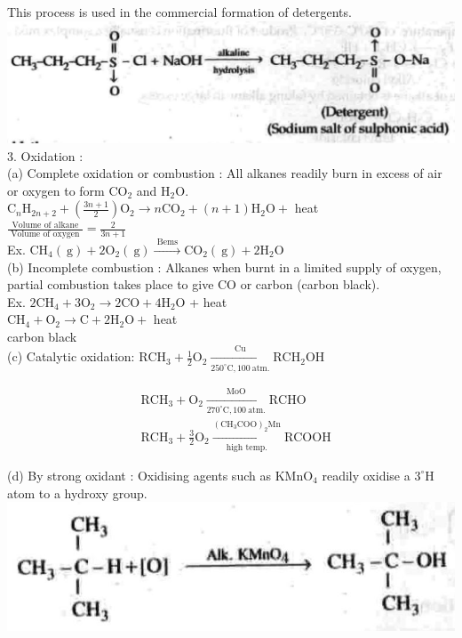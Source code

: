 \documentclass[10pt]{article}
\begin{document}
This process is used in the commercial formation of detergents.\\
\includegraphics[max width=\textwidth, center]{2025_01_28_8470952b98110cec3aabg-174(1)}\\
3. Oxidation :\\
(a) Complete oxidation or combustion : All alkanes readily burn in excess of air or oxygen to form $\mathrm{CO}_{2}$ and $\mathrm{H}_{2} \mathrm{O}$.\\
$\mathrm{C}_{n} \mathrm{H}_{2 n+2}+\left(\frac{3 n+1}{2}\right) \mathrm{O}_{2} \longrightarrow n \mathrm{CO}_{2}+(n+1) \mathrm{H}_{2} \mathrm{O}+$ heat\\
$\frac{\text { Volume of alkane }}{\text { Volume of oxygen }}=\frac{2}{3 n+1}$\\
Ex. $\mathrm{CH}_{4}(\mathrm{~g})+2 \mathrm{O}_{2}(\mathrm{~g}) \xrightarrow{\text { Bems }} \mathrm{CO}_{2}(\mathrm{~g})+2 \mathrm{H}_{2} \mathrm{O}$\\
(b) Incomplete combustion : Alkanes when burnt in a limited supply of oxygen, partial combustion takes place to give CO or carbon (carbon black).\\
Ex. $2 \mathrm{CH}_{4}+3 \mathrm{O}_{2} \longrightarrow 2 \mathrm{CO}+4 \mathrm{H}_{2} \mathrm{O}$ + heat\\
$\mathrm{CH}_{4}+\mathrm{O}_{2} \longrightarrow \mathrm{C}+2 \mathrm{H}_{2} \mathrm{O}+$ heat\\
carbon black\\
(c) Catalytic oxidation: $\mathrm{RCH}_{3}+\frac{1}{2} \mathrm{O}_{2} \xrightarrow[250^{\circ} \mathrm{C}, 100 \mathrm{~atm} .]{\mathrm{Cu}} \mathrm{RCH}_{2} \mathrm{OH}$

$$
\begin{aligned}
& \mathrm{RCH}_{3}+\mathrm{O}_{2} \xrightarrow[270^{\circ} \mathrm{C}, 100 \mathrm{~atm} .]{\mathrm{MoO}} \mathrm{RCHO} \\
& \mathrm{RCH}_{3}+\frac{3}{2} \mathrm{O}_{2} \xrightarrow[\text { high temp. }]{\left(\mathrm{CH}_{3} \mathrm{COO}\right)_{2} \mathrm{Mn}} \mathrm{RCOOH}
\end{aligned}
$$

(d) By strong oxidant : Oxidising agents such as $\mathrm{KMnO}_{4}$ readily oxidise a $3^{\circ} \mathrm{H}$ atom to a hydroxy group.\\
\includegraphics[max width=\textwidth, center]{2025_01_28_8470952b98110cec3aabg-175}
\end{document}

